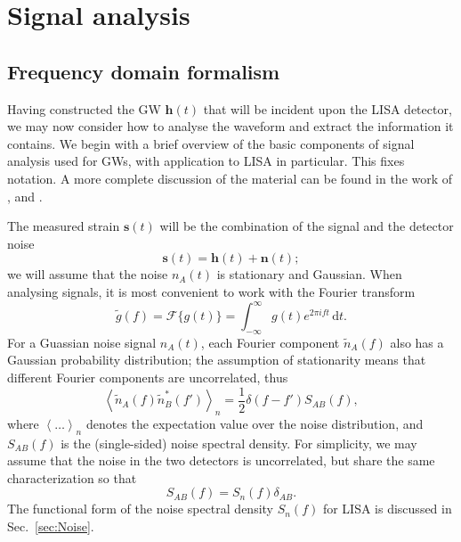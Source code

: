 \documentclass[useAMS,usedcolumn,usegraphicx,usenatbib]{mn2e}
\newcommand{\secref}[1]{Sec.~\ref{sec:#1}}
\newcommand{\dd}{\ensuremath{\mathrm{d}}}
\newcommand{\intd}[4]{\ensuremath{\int_{#1}^{#2}{#3}\,\dd{#4}}}
\newcommand{\recip}[1]{\ensuremath{\frac{1}{#1}}}
\begin{document}
\section{Signal analysis\label{sec:Signal}}

\subsection{Frequency domain formalism}

Having constructed the GW $\boldsymbol{h}(t)$ that will be incident upon the LISA detector, we may now consider how to analyse the waveform and extract the information it contains. We begin with a brief overview of the basic components of signal analysis used for GWs, with application to LISA in particular. This fixes notation. A more complete discussion of the material can be found in the work of \citet{Finn1992}, and \citet{Cutler1994}.

The measured strain $\boldsymbol{s}(t)$ will be the combination of the signal and the detector noise
\begin{equation}
\boldsymbol{s}(t) = \boldsymbol{h}(t) + \boldsymbol{n}(t);
\end{equation}
we will assume that the noise $n_A(t)$ is stationary and Gaussian. When analysing signals, it is most convenient to work with the Fourier transform
\begin{equation}
\tilde{g}(f) = \mathscr{F}\{g(t)\} = \intd{-\infty}{\infty}{g(t)e^{2\pi i ft}}{t}.
\end{equation}
For a Guassian noise signal $n_A(t)$, each Fourier component $\tilde{n}_A(f)$ also has a Gaussian probability distribution; the assumption of stationarity means that different Fourier components are uncorrelated, thus \citep{Cutler1994}
\begin{equation}
\left\langle\tilde{n}_A(f)\tilde{n}_B^*(f')\right\rangle_n = \recip{2}\delta(f - f')S_{AB}(f),
\end{equation}
where $\left\langle\ldots\right\rangle_n$ denotes the expectation value over the noise distribution, and $S_{AB}(f)$ is the (single-sided) noise spectral density. For simplicity, we may assume that the noise in the two detectors is uncorrelated, but share the same characterization so that \citep{Cutler1998}
\begin{equation}
S_{AB}(f) = S_n(f)\delta_{AB}.
\end{equation}
The functional form of the noise spectral density $S_n(f)$ for LISA is discussed in \secref{Noise}.
\end{document}
